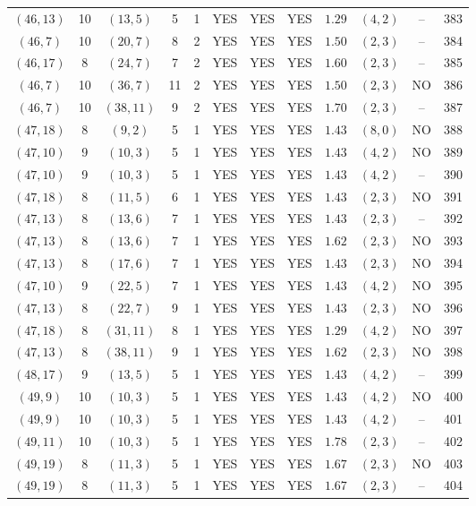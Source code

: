 \begin{longtable}{|c|c|c|c|c|c|c|c|c|c|c|c|}
$(46,13)$ & 10 & $(13,5)$ & 5 & 1 & YES & YES & YES & $1.29$ & $(4,2)$ & -- & 383\\
$(46,7)$ & 10 & $(20,7)$ & 8 & 2 & YES & YES & YES & $1.50$ & $(2,3)$ & -- & 384\\
$(46,17)$ & 8 & $(24,7)$ & 7 & 2 & YES & YES & YES & $1.60$ & $(2,3)$ & -- & 385\\
$(46,7)$ & 10 & $(36,7)$ & 11 & 2 & YES & YES & YES & $1.50$ & $(2,3)$ & NO & 386\\
$(46,7)$ & 10 & $(38,11)$ & 9 & 2 & YES & YES & YES & $1.70$ & $(2,3)$ & -- & 387\\
$(47,18)$ & 8 & $(9,2)$ & 5 & 1 & YES & YES & YES & $1.43$ & $(8,0)$ & NO & 388\\
$(47,10)$ & 9 & $(10,3)$ & 5 & 1 & YES & YES & YES & $1.43$ & $(4,2)$ & NO & 389\\
$(47,10)$ & 9 & $(10,3)$ & 5 & 1 & YES & YES & YES & $1.43$ & $(4,2)$ & -- & 390\\
$(47,18)$ & 8 & $(11,5)$ & 6 & 1 & YES & YES & YES & $1.43$ & $(2,3)$ & NO & 391\\
$(47,13)$ & 8 & $(13,6)$ & 7 & 1 & YES & YES & YES & $1.43$ & $(2,3)$ & -- & 392\\
$(47,13)$ & 8 & $(13,6)$ & 7 & 1 & YES & YES & YES & $1.62$ & $(2,3)$ & NO & 393\\
$(47,13)$ & 8 & $(17,6)$ & 7 & 1 & YES & YES & YES & $1.43$ & $(2,3)$ & NO & 394\\
$(47,10)$ & 9 & $(22,5)$ & 7 & 1 & YES & YES & YES & $1.43$ & $(4,2)$ & NO & 395\\
$(47,13)$ & 8 & $(22,7)$ & 9 & 1 & YES & YES & YES & $1.43$ & $(2,3)$ & NO & 396\\
$(47,18)$ & 8 & $(31,11)$ & 8 & 1 & YES & YES & YES & $1.29$ & $(4,2)$ & NO & 397\\
$(47,13)$ & 8 & $(38,11)$ & 9 & 1 & YES & YES & YES & $1.62$ & $(2,3)$ & NO & 398\\
$(48,17)$ & 9 & $(13,5)$ & 5 & 1 & YES & YES & YES & $1.43$ & $(4,2)$ & -- & 399\\
$(49,9)$ & 10 & $(10,3)$ & 5 & 1 & YES & YES & YES & $1.43$ & $(4,2)$ & NO & 400\\
$(49,9)$ & 10 & $(10,3)$ & 5 & 1 & YES & YES & YES & $1.43$ & $(4,2)$ & -- & 401\\
$(49,11)$ & 10 & $(10,3)$ & 5 & 1 & YES & YES & YES & $1.78$ & $(2,3)$ & -- & 402\\
$(49,19)$ & 8 & $(11,3)$ & 5 & 1 & YES & YES & YES & $1.67$ & $(2,3)$ & NO & 403\\
$(49,19)$ & 8 & $(11,3)$ & 5 & 1 & YES & YES & YES & $1.67$ & $(2,3)$ & -- & 404\\

\end{longtable}

